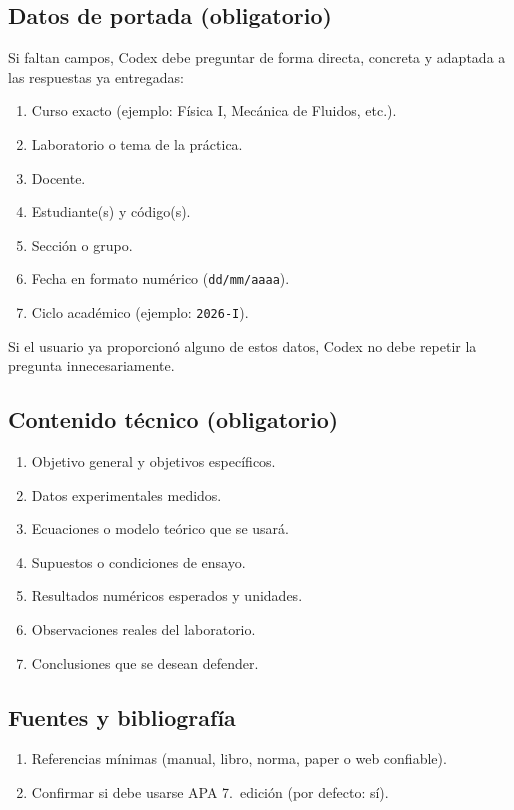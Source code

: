 \documentclass[12pt,a4paper]{article}
\begin{document}
\subsection{Datos de portada (obligatorio)}
Si faltan campos, Codex debe preguntar de forma directa, concreta y adaptada a las respuestas ya entregadas:
\begin{enumerate}
  \item Curso exacto (ejemplo: F\'isica I, Mec\'anica de Fluidos, etc.).
  \item Laboratorio o tema de la pr\'actica.
  \item Docente.
  \item Estudiante(s) y c\'odigo(s).
  \item Secci\'on o grupo.
  \item Fecha en formato num\'erico (\texttt{dd/mm/aaaa}).
  \item Ciclo acad\'emico (ejemplo: \texttt{2026-I}).
\end{enumerate}

Si el usuario ya proporcion\'o alguno de estos datos, Codex no debe repetir la pregunta innecesariamente.

\subsection{Contenido t\'ecnico (obligatorio)}
\begin{enumerate}
  \item Objetivo general y objetivos espec\'ificos.
  \item Datos experimentales medidos.
  \item Ecuaciones o modelo te\'orico que se usar\'a.
  \item Supuestos o condiciones de ensayo.
  \item Resultados num\'ericos esperados y unidades.
  \item Observaciones reales del laboratorio.
  \item Conclusiones que se desean defender.
\end{enumerate}

\subsection{Fuentes y bibliograf\'ia}
\begin{enumerate}
  \item Referencias m\'inimas (manual, libro, norma, paper o web confiable).
  \item Confirmar si debe usarse APA 7.\textordfeminine~edici\'on (por defecto: s\'i).
\end{enumerate}
\end{document}
